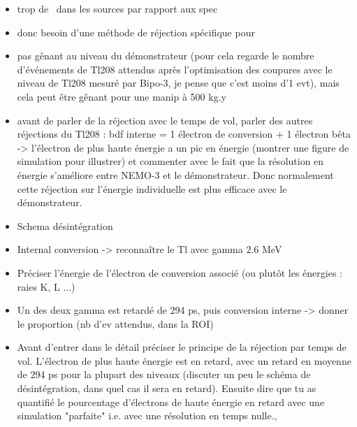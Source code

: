\begin{itemize}
\item trop de \Tl\ dans les sources par rapport aux spec
\item donc besoin d'une méthode de réjection spécifique pour \Tl\
\item pas gênant au niveau du démonstrateur (pour cela regarde le nombre d'événements de Tl208 attendus après l'optimisation des coupures avec le niveau de Tl208 mesuré par Bipo-3, je pense que c'est moins d'1 evt), mais cela peut être gênant pour une manip à 500 kg.y
\item avant de parler de la réjection avec le temps de vol, parler des autres réjections du Tl208 : bdf interne = 1 électron de conversion + 1 électron bêta -> l'électron de plus haute énergie a un pic en énergie (montrer une figure de simulation pour illustrer) et commenter avec le fait que la résolution en énergie s'améliore entre NEMO-3 et le démonstrateur. Donc normalement cette réjection sur l'énergie individuelle est plus efficace avec le démonstrateur.
\item Schema désintégration
\item Internal conversion -> reconnaître le Tl avec gamma $2.6$ MeV
\item Préciser l'énergie de l'électron de conversion associé (ou plutôt les énergies : raies K, L ...)
\item Un des deux gamma est retardé de 294 ps, puis conversion interne -> donner le proportion (nb d'ev attendus, dans la ROI)
\item Avant d'entrer dans le détail préciser le principe de la réjection par temps de vol.
L'électron de plus haute énergie est en retard, avec un retard en moyenne de 294 ps pour la plupart des niveaux (discuter un peu le schéma de désintégration, dans quel cas il sera en retard).
Ensuite dire que tu as quantifié le pourcentage d'électrons de haute énergie en retard avec une simulation "parfaite" i.e. avec une résolution en  temps  nulle.,
\end{itemize}


